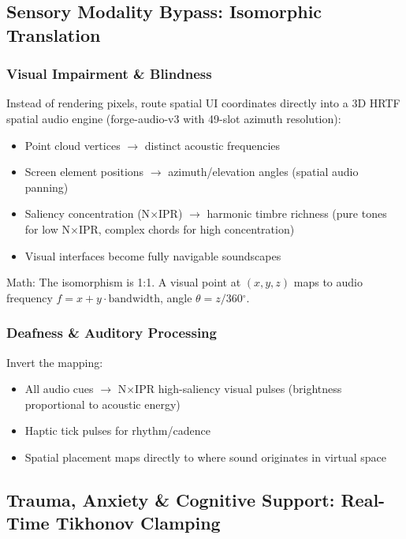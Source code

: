 \documentclass[11pt,oneside]{article}
\theoremstyle{definition}
\begin{document}
\subsection{Sensory Modality Bypass: Isomorphic Translation}

\subsubsection{Visual Impairment \& Blindness}

Instead of rendering pixels, route spatial UI coordinates directly into a 3D HRTF spatial audio engine (forge-audio-v3 with 49-slot azimuth resolution):

\begin{itemize}
  \item Point cloud vertices $\to$ distinct acoustic frequencies
  \item Screen element positions $\to$ azimuth/elevation angles (spatial audio panning)
  \item Saliency concentration (N\ensuremath{\times}IPR) $\to$ harmonic timbre richness (pure tones for low N\ensuremath{\times}IPR, complex chords for high concentration)
  \item Visual interfaces become fully navigable soundscapes
\end{itemize}

Math: The isomorphism is 1:1. A visual point at $(x, y, z)$ maps to audio frequency $f = x + y \cdot \text{bandwidth}$, angle $\theta = z / 360\ensuremath{^\circ}$.

\subsubsection{Deafness \& Auditory Processing}

Invert the mapping:
\begin{itemize}
  \item All audio cues $\to$ N\ensuremath{\times}IPR high-saliency visual pulses (brightness proportional to acoustic energy)
  \item Haptic tick pulses for rhythm/cadence
  \item Spatial placement maps directly to where sound originates in virtual space
\end{itemize}

\subsection{Trauma, Anxiety \& Cognitive Support: Real-Time Tikhonov Clamping}
\end{document}
